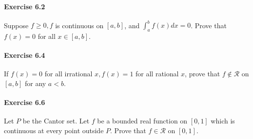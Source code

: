 \documentclass{article}
\begin{document}
\paragraph{Exercise 6.2} Suppose $f \geq 0, f$ is continuous on $[a, b]$, and $\int_{a}^{b} f(x) d x=0$. Prove that $f(x)=0$ for all $x \in[a, b]$.

\paragraph{Exercise 6.4} If $f(x)=0$ for all irrational $x, f(x)=1$ for all rational $x$, prove that $f \notin \mathcal{R}$ on $[a, b]$ for any $a<b$.

\paragraph{Exercise 6.6} Let $P$ be the Cantor set. Let $f$ be a bounded real function on $[0,1]$ which is continuous at every point outside $P$. Prove that $f \in \mathcal{R}$ on $[0,1]$.
\end{document}
